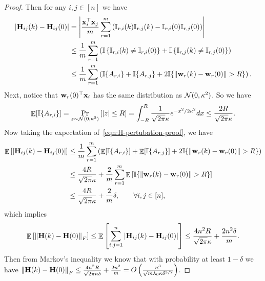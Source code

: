 \begin{proof}
	Then for any $i, j\in[n]$ we have
	\begin{equation} \label{eqn:H-pertubation-proof}
	\begin{aligned}
	\left| \mathbf{H}_{ij}(k) - \mathbf{H}_{ij}(0) \right|
	&= \left| \frac{\mathbf{x}_i^\top \mathbf{x}_j}{m} \sum_{r=1}^{m} \left( \mathbb{I}_{r,i}(k) \mathbb{I}_{r,j}(k) - \mathbb{I}_{r,i}(0) \mathbb{I}_{r,j}(0) \right) \right| \\
	&\le \frac1m \sum_{r=1}^{m} \left( \mathbb{I}\left\{ \mathbb{I}_{r, i}(k) \not= \mathbb{I}_{r, i}(0) \right\} + \mathbb{I}\left\{ \mathbb{I}_{r, j}(k) \not= \mathbb{I}_{r, j}(0)  \right\} \right) \\
	&\le \frac1m \sum_{r=1}^{m} \left( \mathbb{I}\{A_{r, i}\}+\mathbb{I}\{A_{r, j}\} + 2 \mathbb{I}\{ \left\|\mathbf{w}_r(k) - \mathbf{w}_r(0)\right\| > R \} \right).
	\end{aligned}
	\end{equation}
	Next, notice that $\mathbf{w}_r(0)^\top \mathbf{x}_i$ has the same distribution as $\mathcal{N}(0, \kappa^2)$. So we have
	\begin{equation} \label{eqn:A_{ri}-bound}
	\E[\indict\{A_{r, i}\}] = \Pr_{z\sim \calN(0, \kappa^2)} \left[ |z| \le R \right]
	= \int_{-R}^{R} \frac{1}{\sqrt{2\pi}\kappa} e^{-x^2/2\kappa^2} dx
	\le \frac{2R}{\sqrt{2\pi}\kappa}.
	\end{equation}
	Now taking the expectation of~\eqref{eqn:H-pertubation-proof}, we have
	\begin{align*}
	\mathop\mathbb{E}\left[ \left| \mathbf{H}_{ij}(k) - \mathbf{H}_{ij}(0) \right| \right]
	&\le \frac1m \sum_{r=1}^{m} \left( \mathop\mathbb{E}[\mathbb{I}\{A_{r, i}\}] + \mathop\mathbb{E}[\mathbb{I}\{A_{r, j}\}] + 2 \mathbb{I}\{ \left\|\mathbf{w}_r(k) - \mathbf{w}_r(0)\right\| > R \} \right)\\
	&\le \frac{4R}{\sqrt{2\pi}\kappa} + \frac2m \sum_{r=1}^{m}  \mathop\mathbb{E}\left[ \mathbb{I}\{ \left\|\mathbf{w}_r(k) - \mathbf{w}_r(0)\right\| > R \} \right]\\
	&\le  \frac{4R}{\sqrt{2\pi}\kappa} + \frac2m \delta, \qquad \forall i, j \in[n],
	\end{align*}
	which implies
	\begin{equation*}
	\mathop\mathbb{E} \left[ \left\|\mathbf{H}(k) - \mathbf{H}(0)\right\|_F \right]
	\le \mathop\mathbb{E}\left[ \sum_{i, j=1}^n \left| \mathbf{H}_{ij}(k) - \mathbf{H}_{ij}(0) \right| \right]
	\le \frac{4n^2R}{\sqrt{2\pi}\kappa} + \frac{2n^2\delta}{m}.
	\end{equation*}
	Then from Markov's inequality we know that with probability at least $1-\delta$ we have $\left\|\mathbf{H}(k) - \mathbf{H}(0)\right\|_F \le \frac{4n^2R}{\sqrt{2\pi}\kappa\delta} + \frac{2n^2}{m} = O\left( \frac{n^3}{\sqrt m \lambda_0 \kappa \delta^{3/2}} \right) $. %
	

\end{proof}
